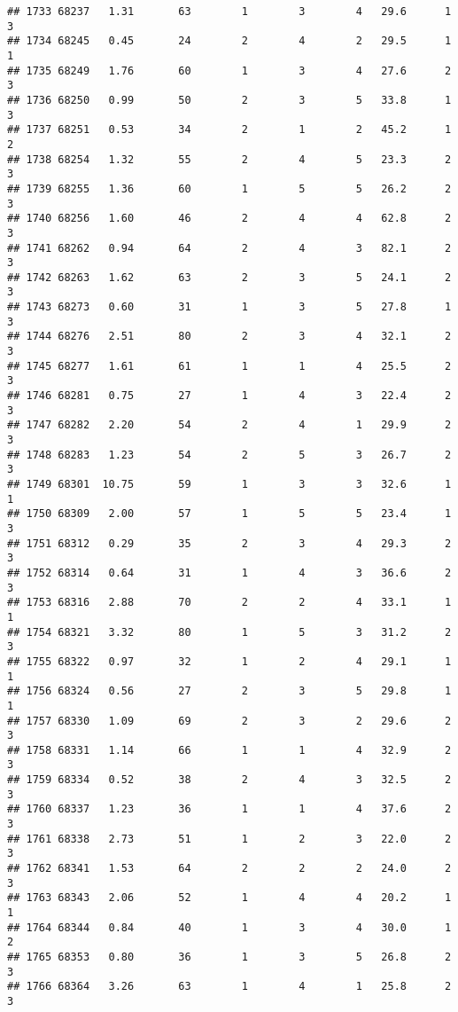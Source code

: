 \documentclass[
]{article}
\begin{document}
\begin{verbatim}
## 1733 68237   1.31       63        1        3        4   29.6      1      3
## 1734 68245   0.45       24        2        4        2   29.5      1      1
## 1735 68249   1.76       60        1        3        4   27.6      2      3
## 1736 68250   0.99       50        2        3        5   33.8      1      3
## 1737 68251   0.53       34        2        1        2   45.2      1      2
## 1738 68254   1.32       55        2        4        5   23.3      2      3
## 1739 68255   1.36       60        1        5        5   26.2      2      3
## 1740 68256   1.60       46        2        4        4   62.8      2      3
## 1741 68262   0.94       64        2        4        3   82.1      2      3
## 1742 68263   1.62       63        2        3        5   24.1      2      3
## 1743 68273   0.60       31        1        3        5   27.8      1      3
## 1744 68276   2.51       80        2        3        4   32.1      2      3
## 1745 68277   1.61       61        1        1        4   25.5      2      3
## 1746 68281   0.75       27        1        4        3   22.4      2      3
## 1747 68282   2.20       54        2        4        1   29.9      2      3
## 1748 68283   1.23       54        2        5        3   26.7      2      3
## 1749 68301  10.75       59        1        3        3   32.6      1      1
## 1750 68309   2.00       57        1        5        5   23.4      1      3
## 1751 68312   0.29       35        2        3        4   29.3      2      3
## 1752 68314   0.64       31        1        4        3   36.6      2      3
## 1753 68316   2.88       70        2        2        4   33.1      1      1
## 1754 68321   3.32       80        1        5        3   31.2      2      3
## 1755 68322   0.97       32        1        2        4   29.1      1      1
## 1756 68324   0.56       27        2        3        5   29.8      1      1
## 1757 68330   1.09       69        2        3        2   29.6      2      3
## 1758 68331   1.14       66        1        1        4   32.9      2      3
## 1759 68334   0.52       38        2        4        3   32.5      2      3
## 1760 68337   1.23       36        1        1        4   37.6      2      3
## 1761 68338   2.73       51        1        2        3   22.0      2      3
## 1762 68341   1.53       64        2        2        2   24.0      2      3
## 1763 68343   2.06       52        1        4        4   20.2      1      1
## 1764 68344   0.84       40        1        3        4   30.0      1      2
## 1765 68353   0.80       36        1        3        5   26.8      2      3
## 1766 68364   3.26       63        1        4        1   25.8      2      3

\end{verbatim}
\end{document}
